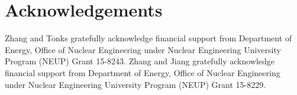 \documentclass[3p,10pt,sort&compress]{elsarticle}
\begin{document}
\section*{Acknowledgements}

Zhang and Tonks gratefully acknowledge financial support from Department of Energy, Office of Nuclear Engineering under Nuclear Engineering University Program (NEUP) Grant 15-8243. Zhang and Jiang gratefully acknowledge financial support from Department of Energy, Office of Nuclear Engineering under Nuclear Engineering University Program (NEUP) Grant 15-8229.

% 



\end{document}
